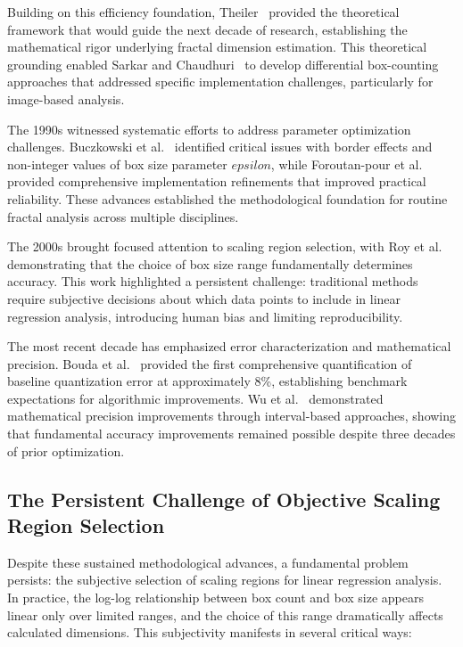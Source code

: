 \documentclass[preprint,12pt]{elsarticle}
\def\epsilon{epsilon}%
\begin{document}
Building on this efficiency foundation, Theiler~\cite{theiler1990} provided the theoretical framework that would guide the next decade of research, establishing the mathematical rigor underlying fractal dimension estimation. This theoretical grounding enabled Sarkar and Chaudhuri~\cite{sarkar1994} to develop differential box-counting approaches that addressed specific implementation challenges, particularly for image-based analysis.

The 1990s witnessed systematic efforts to address parameter optimization challenges. Buczkowski et al.~\cite{buczkowski1998} identified critical issues with border effects and non-integer values of box size parameter $\epsilon$, while Foroutan-pour et al.~\cite{foroutan1999} provided comprehensive implementation refinements that improved practical reliability. These advances established the methodological foundation for routine fractal analysis across multiple disciplines.

The 2000s brought focused attention to scaling region selection, with Roy et al.~\cite{roy2007} demonstrating that the choice of box size range fundamentally determines accuracy. This work highlighted a persistent challenge: traditional methods require subjective decisions about which data points to include in linear regression analysis, introducing human bias and limiting reproducibility.

The most recent decade has emphasized error characterization and mathematical precision. Bouda et al.~\cite{bouda2016} provided the first comprehensive quantification of baseline quantization error at approximately 8\%, establishing benchmark expectations for algorithmic improvements. Wu et al.~\cite{wu2020} demonstrated mathematical precision improvements through interval-based approaches, showing that fundamental accuracy improvements remained possible despite three decades of prior optimization.

\subsection{The Persistent Challenge of Objective Scaling Region Selection}

Despite these sustained methodological advances, a fundamental problem persists: the subjective selection of scaling regions for linear regression analysis. In practice, the log-log relationship between box count and box size appears linear only over limited ranges, and the choice of this range dramatically affects calculated dimensions. This subjectivity manifests in several critical ways:
\end{document}
